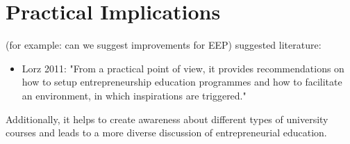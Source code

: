 \section{Practical Implications}
(for example: can we suggest improvements for EEP)
suggested literature:
\begin{itemize}
\item Lorz 2011: "From a practical point of view, it provides recommendations on how to setup entrepreneurship education programmes and how to facilitate an environment, in which inspirations are triggered."
\end{itemize}
Additionally, it helps to create awareness about different types of university courses and leads to a more diverse discussion of entrepreneurial education.